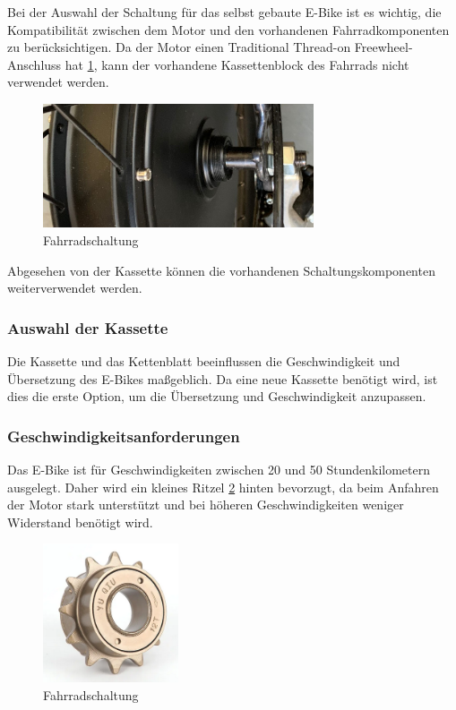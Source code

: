 Bei der Auswahl der Schaltung für das selbst gebaute E-Bike ist es wichtig, die Kompatibilität zwischen dem Motor und den vorhandenen Fahrradkomponenten zu berücksichtigen. Da der Motor einen Traditional Thread-on Freewheel-Anschluss hat \ref{fig:18}, kann der vorhandene Kassettenblock des Fahrrads nicht verwendet werden.

\begin{figure}[h]
    \centering
    \includegraphics[width=8cm]{images/Radnabenmotoranschluss.jpg}
    \caption{Fahrradschaltung\cite{noauthor_schaltung_nodate}}
    \label{fig:18}
\end{figure}


Abgesehen von der Kassette können die vorhandenen Schaltungskomponenten weiterverwendet werden.

\subsubsection*{Auswahl der Kassette}
Die Kassette und das Kettenblatt beeinflussen die Geschwindigkeit und Übersetzung des E-Bikes maßgeblich. Da eine neue Kassette benötigt wird, ist dies die erste Option, um die Übersetzung und Geschwindigkeit anzupassen.


\subsubsection*{Geschwindigkeitsanforderungen}
Das E-Bike ist für Geschwindigkeiten zwischen 20 und 50 Stundenkilometern ausgelegt. Daher wird ein kleines Ritzel \ref{fig:19} hinten bevorzugt, da beim Anfahren der Motor stark unterstützt und bei höheren Geschwindigkeiten weniger Widerstand benötigt wird.

\begin{figure}[h]
    \centering
    \includegraphics[width=4cm]{images/kleines Ritzel.png}
    \caption{Fahrradschaltung\cite{noauthor_423_nodate}}
    \label{fig:19}
\end{figure}


